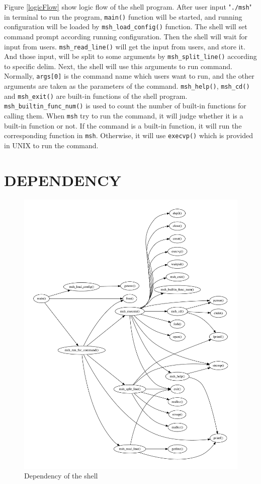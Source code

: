 \documentclass{article}
\begin{document}
Figure \ref{logicFlow} show logic flow of the shell program.
After user input "\verb|./msh|" in terminal to run the program, \verb|main()| function will be started, and running configuration will be loaded by \verb|msh_load_config()| function.
The shell will set command prompt according running configuration.
Then the shell will wait for input from users.
\verb|msh_read_line()| will get the input from users, and store it.
And those input, will be split to some arguments by \verb|msh_split_line()| according to specific delim.
Next, the shell will use this arguments to run command.
Normally, \verb|args[0]| is the command name which users want to run, and the other arguments are taken as the parameters of the command.
\verb|msh_help()|, \verb|msh_cd()| and \verb|msh_exit()| are built-in functions of the shell program.
\verb|msh_builtin_func_num()| is used to count the number of built-in functions for calling them.
When \verb|msh| try to run the command, it will judge whether it is a built-in function or not.
If the command is a built-in function, it will run the corresponding function in \verb|msh|.
Otherwise, it will use \verb|execvp()| which is provided in UNIX to run the command.


\newpage
\section{DEPENDENCY}

\begin{figure}[h]
\centering
\includegraphics[scale=0.3]{fig/ShellDependency.pdf}
\caption{Dependency of the shell}
\label{dependency}
\end{figure}
\end{document}
